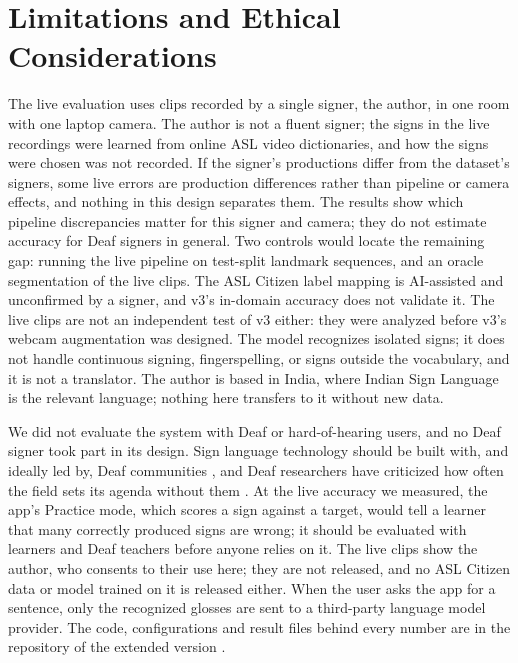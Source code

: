 \section{Limitations and Ethical Considerations}
\label{sec:limitations}

The live evaluation uses  clips recorded by a single signer, the author, in one room
with one laptop camera. The author is not a fluent signer; the signs in the live recordings were
learned from online ASL video dictionaries, and how the  signs were chosen was not
recorded. If the signer's productions differ from the dataset's signers, some live errors are
production differences rather than pipeline or camera effects, and nothing in this design
separates them. The results show which pipeline discrepancies matter for this signer and camera;
they do not estimate accuracy for Deaf signers in general. Two controls would locate the remaining
gap: running the live pipeline on test-split landmark sequences, and an oracle segmentation of the
live clips. The ASL Citizen label mapping is AI-assisted and unconfirmed by a signer, and v3's
in-domain accuracy does not validate it. The live clips are not an independent test of v3 either:
they were analyzed before v3's webcam augmentation was designed. The model recognizes
 isolated signs; it does not handle continuous signing, fingerspelling, or signs
outside the vocabulary, and it is not a translator. The author is based in India, where Indian
Sign Language is the relevant language; nothing here transfers to it without new data.

We did not evaluate the system with Deaf or hard-of-hearing users, and no Deaf signer took part in
its design. Sign language technology should be built with, and ideally led by, Deaf communities
\cite{bragg2019interdisciplinary,yin2021including,fox2023bestpractices}, and Deaf researchers have
criticized how often the field sets its agenda without them \cite{desai2024systemic}. At the live
accuracy we measured, the app's Practice mode, which scores a sign against a target, would tell a
learner that many correctly produced signs are wrong; it should be evaluated with learners and
Deaf teachers before anyone relies on it. The live clips show the author, who consents to their use here; they are not
released, and no ASL Citizen data or model trained on it is released either. When the user asks
the app for a sentence, only the recognized glosses are sent to a third-party language model
provider. The code, configurations and result files behind every number are in the repository of
the extended version \cite{shukla2026manuvox}.
